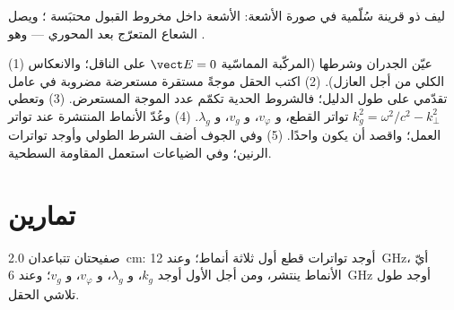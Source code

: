 \begin{omfigure}

{\small ليف ذو قرينة سُلّمية في صورة الأشعة: الأشعة داخل
مخروط القبول محتبَسة ؛ ويصل الشعاع
المتعرّج بعد المحوري --- وهو .}
\end{omfigure}

\begin{method}\label{met:b2:guided-waves:method}
(1) عيّن الجدران وشرطها (المركّبة المماسّية $\vect E = 0$ على
الناقل؛ والانعكاس الكلي من أجل العازل). (2) اكتب الحقل
موجةً مستقرة مستعرضة مضروبة في عامل تقدّمي على طول
الدليل؛ فالشروط الحدية تكمّم عدد الموجة المستعرض.
(3) وتعطي  $k_g^2 = \omega^2/c^2 - k_\perp^2$ تواتر
القطع، و $v_\varphi$، و $v_g$، و $\lambda_g$. (4) وعُدّ الأنماط المنتشرة عند
تواتر العمل؛ واقصد أن يكون واحدًا. (5) وفي الجوف أضف الشرط
الطولي وأوجد تواترات الرنين؛ وفي الضياعات استعمل
المقاومة السطحية.
\end{method}

\section{تمارين}

\begin{exercise}[$\star$]\label{exo:b2:guided-waves:1}
صفيحتان تتباعدان \qty{2.0}{cm}: أوجد تواترات قطع أول ثلاثة أنماط؛
وعند \qty{12}{GHz}، أيّ الأنماط ينتشر، ومن أجل الأول أوجد $k_g$،
و $\lambda_g$، و $v_\varphi$، و $v_g$؛ وعند \qty{6}{GHz} أوجد طول تلاشي الحقل.
\end{exercise}

